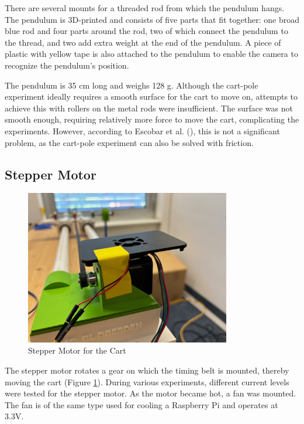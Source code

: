 There are several mounts for a threaded rod from which the pendulum hangs. The pendulum is 3D-printed and consists of five parts that fit together: one broad blue rod and four parts around the rod, two of which connect the pendulum to the thread, and two add extra weight at the end of the pendulum. A piece of plastic with yellow tape is also attached to the pendulum to enable the camera to recognize the pendulum's position.

The pendulum is 35 cm long and weighs 128 g. Although the cart-pole experiment ideally requires a smooth surface for the cart to move on, attempts to achieve this with rollers on the metal rods were insufficient. The surface was not smooth enough, requiring relatively more force to move the cart, complicating the experiments. However, according to Escobar et al. (\citeyear{manrique_escobar_parametric_2020}), this is not a significant problem, as the cart-pole experiment can also be solved with friction.

\subsection{Stepper Motor}
\begin{figure}[htbp]
    \centering
    \includegraphics[width=0.8\textwidth]{img/stepper_motor.jpg}
    \caption{Stepper Motor for the Cart}
    \label{fig:stepper_motor}
\end{figure}
The stepper motor rotates a gear on which the timing belt is mounted, thereby moving the cart (Figure \ref{fig:stepper_motor}). During various experiments, different current levels were tested for the stepper motor. As the motor became hot, a fan was mounted. The fan is of the same type used for cooling a Raspberry Pi and operates at 3.3V.

